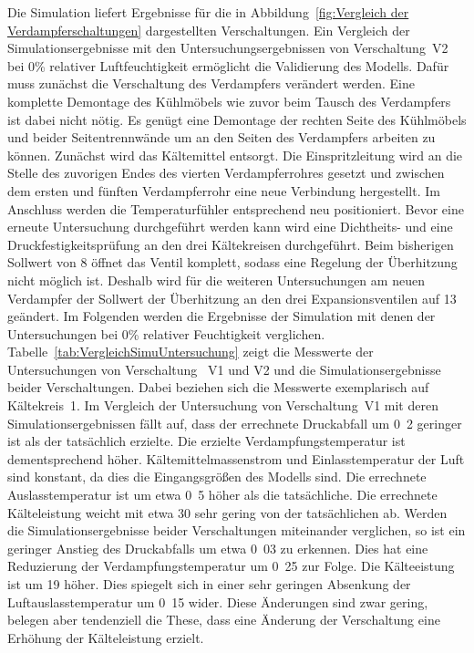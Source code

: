 Die Simulation liefert Ergebnisse für die in Abbildung~\ref{fig:Vergleich der Verdampferschaltungen} dargestellten Verschaltungen. Ein Vergleich der Simulationsergebnisse mit den Untersuchungsergebnissen von Verschaltung~V2 bei \unit{0}{\%} relativer Luftfeuchtigkeit ermöglicht die Validierung des Modells. Dafür muss zunächst die Verschaltung des Verdampfers verändert werden. Eine komplette Demontage des Kühlmöbels wie zuvor beim Tausch des Verdampfers ist dabei nicht nötig. Es genügt eine Demontage der rechten Seite des Kühlmöbels und beider Seitentrennwände um an den Seiten des Verdampfers arbeiten zu können. Zunächst wird das Kältemittel entsorgt. Die Einspritzleitung wird an die Stelle des zuvorigen Endes des vierten Verdampferrohres gesetzt und zwischen dem ersten und fünften Verdampferrohr eine neue Verbindung hergestellt. Im Anschluss werden die Temperaturfühler entsprechend neu positioniert. Bevor eine erneute Untersuchung durchgeführt werden kann wird eine Dichtheits- und eine Druckfestigkeitsprüfung an den drei Kältekreisen durchgeführt. Beim bisherigen Sollwert von \unit{8}{\kelvin} öffnet das Ventil komplett, sodass eine Regelung der Überhitzung nicht möglich ist. Deshalb wird für die weiteren Untersuchungen am neuen Verdampfer der Sollwert der Überhitzung an den drei Expansionsventilen auf \unit{13}{\kelvin} geändert. \newline 
Im Folgenden werden die Ergebnisse der Simulation mit denen der Untersuchungen bei \unit{0}{\%} relativer Feuchtigkeit verglichen. Tabelle~\ref{tab:VergleichSimuUntersuchung} zeigt die Messwerte der Untersuchungen von Verschaltung~ V1 und V2 und die Simulationsergebnisse beider Verschaltungen. Dabei beziehen sich die Messwerte exemplarisch auf Kältekreis~1. 
Im Vergleich der Untersuchung von Verschaltung~V1 mit deren Simulationsergebnissen fällt auf, dass der errechnete Druckabfall um \unit{0.2}{\bbar} geringer ist als der tatsächlich erzielte. Die erzielte Verdampfungstemperatur ist dementsprechend höher.
Kältemittelmassenstrom und Einlasstemperatur der Luft sind konstant, da dies die Eingangsgrößen des Modells sind. Die errechnete Auslasstemperatur ist um etwa \unit{0.5}{\kelvin} höher als die tatsächliche. Die errechnete Kälteleistung weicht mit etwa \unit{30}{\watt} sehr gering von der tatsächlichen ab.  \newline Werden die Simulationsergebnisse beider Verschaltungen miteinander verglichen, so ist ein geringer Anstieg des Druckabfalls um etwa \unit{0.03}{\bbar} zu erkennen. Dies hat eine Reduzierung der Verdampfungstemperatur um \unit{0.25}{\kelvin} zur Folge. Die Kälteeistung ist um \unit{19}{\watt} höher. Dies spiegelt sich in einer sehr geringen Absenkung der Luftauslasstemperatur um \unit{0.15}{\kelvin} wider. Diese Änderungen sind zwar gering, belegen aber tendenziell die These, dass eine Änderung der Verschaltung eine Erhöhung der Kälteleistung erzielt. \newline
